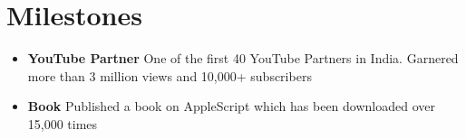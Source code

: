 \documentclass[a4paper,12pt]{article} %
\newcommand{\generalListStart}{\begin{itemize}[leftmargin=2em]\setlength\itemsep{0.02em}}
\newcommand{\generalListEnd}{\end{itemize}}
\newcommand{\oneKeyValuePairElement}[2]{
	\item \textbf{#1}{ #2}
}
\begin{document}

\vspace{0.2em}\section*{Milestones}

\generalListStart
	\oneKeyValuePairElement{YouTube Partner}{One of the first 40 YouTube Partners in India. Garnered more than 3 million views and 10,000+ subscribers}
	\oneKeyValuePairElement{Book}{Published a book on AppleScript which has been downloaded over 15,000 times}
\generalListEnd
\end{document}
